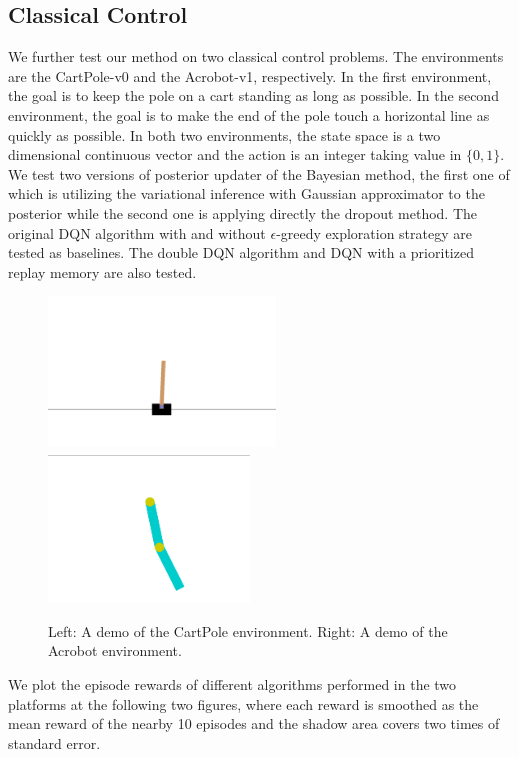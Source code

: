 \documentclass[a4paper,12pt]{article}
\begin{document}
\subsection{Classical Control}
We further test our method on two classical control problems. The environments are the CartPole-v0 and the Acrobot-v1, respectively. In the first environment, the goal is to keep  the pole on a cart standing as long as possible. In the second environment, the goal is to make the end of the pole touch a horizontal line as quickly as possible. In both two environments, the state space is a two dimensional continuous vector and the action is an integer taking value in $\{0, 1\}$. We test two versions of posterior updater of the Bayesian method, the first one of which is utilizing the variational inference with Gaussian approximator to the posterior while the second one is applying directly the dropout method.  The original DQN algorithm with and without $\epsilon$-greedy exploration strategy are tested as baselines. The double DQN algorithm and DQN with a prioritized replay memory are also tested. 

\begin{figure}[htb!]
\center
\includegraphics[height=4cm]{Cartpole_sample}
\includegraphics[height=4cm]{Acrobot_sample}
\caption{Left: A demo of the CartPole environment. Right: A demo of the Acrobot environment. }
\end{figure}

We plot the episode rewards of different algorithms performed in the two platforms at the following two figures, where each reward is smoothed as the mean reward of the nearby 10 episodes and the shadow area covers two times of standard error. 
\end{document}
